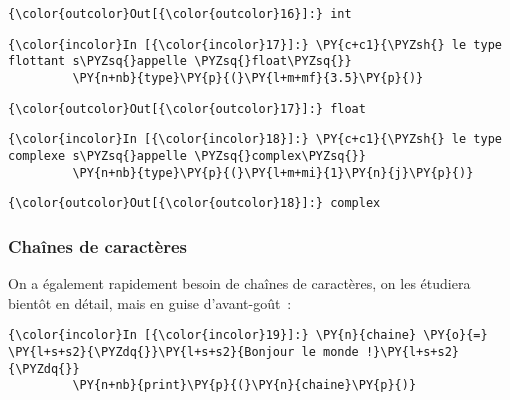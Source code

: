 \begin{Verbatim}[commandchars=\\\{\},frame=single,framerule=0.3mm,rulecolor=\color{cellframecolor}]
{\color{outcolor}Out[{\color{outcolor}16}]:} int
\end{Verbatim}
            
    \begin{Verbatim}[commandchars=\\\{\},frame=single,framerule=0.3mm,rulecolor=\color{cellframecolor}]
{\color{incolor}In [{\color{incolor}17}]:} \PY{c+c1}{\PYZsh{} le type flottant s\PYZsq{}appelle \PYZsq{}float\PYZsq{}}
         \PY{n+nb}{type}\PY{p}{(}\PY{l+m+mf}{3.5}\PY{p}{)}
\end{Verbatim}


\begin{Verbatim}[commandchars=\\\{\},frame=single,framerule=0.3mm,rulecolor=\color{cellframecolor}]
{\color{outcolor}Out[{\color{outcolor}17}]:} float
\end{Verbatim}
            
    \begin{Verbatim}[commandchars=\\\{\},frame=single,framerule=0.3mm,rulecolor=\color{cellframecolor}]
{\color{incolor}In [{\color{incolor}18}]:} \PY{c+c1}{\PYZsh{} le type complexe s\PYZsq{}appelle \PYZsq{}complex\PYZsq{}}
         \PY{n+nb}{type}\PY{p}{(}\PY{l+m+mi}{1}\PY{n}{j}\PY{p}{)}
\end{Verbatim}


\begin{Verbatim}[commandchars=\\\{\},frame=single,framerule=0.3mm,rulecolor=\color{cellframecolor}]
{\color{outcolor}Out[{\color{outcolor}18}]:} complex
\end{Verbatim}
            
    \hypertarget{chauxeenes-de-caractuxe8res}{%
\subsubsection{Chaînes de
caractères}\label{chauxeenes-de-caractuxe8res}}

    On a également rapidement besoin de chaînes de caractères, on les
étudiera bientôt en détail, mais en guise d'avant-goût~:

    \begin{Verbatim}[commandchars=\\\{\},frame=single,framerule=0.3mm,rulecolor=\color{cellframecolor}]
{\color{incolor}In [{\color{incolor}19}]:} \PY{n}{chaine} \PY{o}{=} \PY{l+s+s2}{\PYZdq{}}\PY{l+s+s2}{Bonjour le monde !}\PY{l+s+s2}{\PYZdq{}}
         \PY{n+nb}{print}\PY{p}{(}\PY{n}{chaine}\PY{p}{)}
\end{Verbatim}


